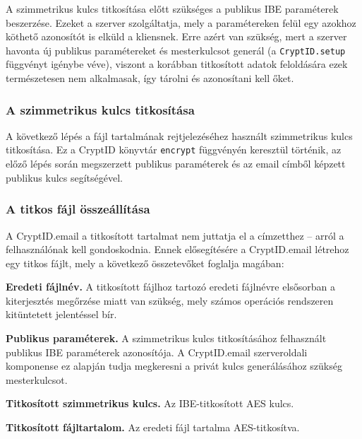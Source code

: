 A szimmetrikus kulcs titkosítása előtt szükséges a publikus IBE paraméterek beszerzése. Ezeket a szerver szolgáltatja, mely a paramétereken felül egy azokhoz köthető azonosítót is elküld a kliensnek. Erre azért van szükség, mert a szerver havonta új publikus paramétereket és mesterkulcsot generál (a \texttt{CryptID.setup} függvényt igénybe véve), viszont a korábban titkosított adatok feloldására ezek természetesen nem alkalmasak, így tárolni és azonosítani kell őket.

\subsubsection{A szimmetrikus kulcs titkosítása}

A következő lépés a fájl tartalmának rejtjelezéséhez használt szimmetrikus kulcs titkosítása. Ez a CryptID könyvtár \texttt{encrypt} függvényén keresztül történik, az előző lépés során megszerzett publikus paraméterek és az email címből képzett publikus kulcs segítségével.

\subsubsection{A titkos fájl összeállítása}

A CryptID.email a titkosított tartalmat nem juttatja el a címzetthez – arról a felhasználónak kell gondoskodnia. Ennek elősegítésére a CryptID.email létrehoz egy titkos fájlt, mely a következő összetevőket foglalja magában:

\begin{outdentlist}
    \item[]\textbf{Eredeti fájlnév.}
    A titkosított fájlhoz tartozó eredeti fájlnévre elsősorban a kiterjesztés megőrzése miatt van szükség, mely számos operációs rendszeren kitüntetett jelentéssel bír.

    \item[]\textbf{Publikus paraméterek.}
    A szimmetrikus kulcs titkosításához felhasznált publikus IBE paraméterek azonosítója. A CryptID.email szerveroldali komponense ez alapján tudja megkeresni a privát kulcs generálásához szükség mesterkulcsot.

    \item[]\textbf{Titkosított szimmetrikus kulcs.}
    Az IBE-titkosított AES kulcs.

    \item[]\textbf{Titkosított fájltartalom.} 
    Az eredeti fájl tartalma AES-titkosítva.
\end{outdentlist}

